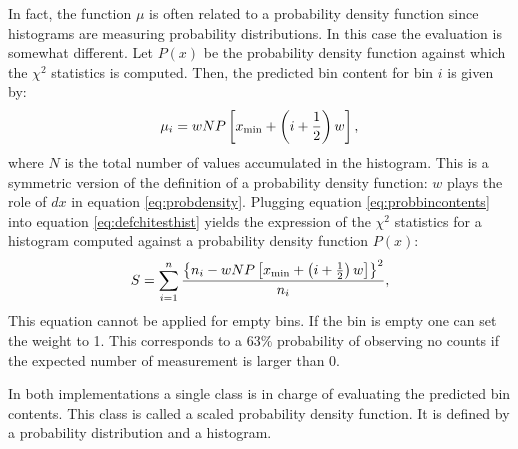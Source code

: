 \documentclass[twoside]{book}
\begin{document}
In fact, the function $\mu$ is often related to a probability
density function since histograms are measuring probability
distributions. In this case the evaluation is somewhat different.
Let $P\left(x\right)$ be the probability density function against
which the $\chi^2$ statistics is computed. Then, the predicted bin
content for bin $i$ is given by:
\begin{equation}
\label{eq:probbincontents}
 \mu_i = wNP\left[x_{\min} + \left(i+{1\over 2} \right)w\right],
\end{equation}
where $N$ is the total number of values accumulated in the
histogram. This is a symmetric version of the definition of a
probability density function: $w$ plays the role of $dx$ in
equation \ref{eq:probdensity}. Plugging equation
\ref{eq:probbincontents} into equation \ref{eq:defchitesthist}
yields the expression of the $\chi^2$ statistics for a histogram
computed against a probability density function $P\left(x\right)$:
\begin{equation}
\label{eq:defchitesthistprob}
  S=\sum_{i=1}^n
  { \left\{n_i - wNP\left[x_{\min} + \left(i+{1\over 2} \right)w\right]\right\}^2 \over
  n_i},
\end{equation}
This equation cannot be applied for empty bins. If the bin is
empty one can set the weight to 1. This corresponds to a $63\%$
probability of observing no counts if the expected number of
measurement is larger than 0.

In both implementations a single class is in charge of evaluating
the predicted bin contents. This class is called a scaled
probability density function. It is defined by a probability
distribution and a histogram.
\end{document}
